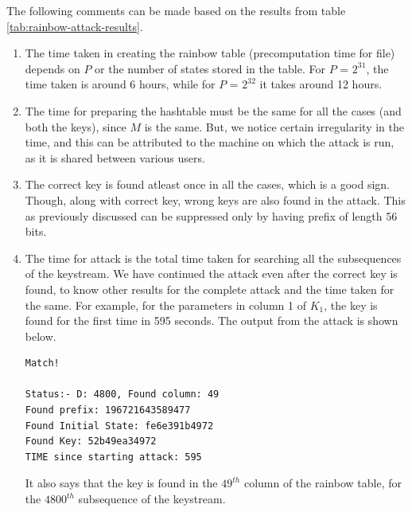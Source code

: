 The following comments can be made based on the results from table \ref{tab:rainbow-attack-results}.
\begin{enumerate}
\item The time taken in creating the rainbow table (precomputation time for file) depends on $P$ or the number of states stored in the table. For $P$ = $2^{31}$, the time taken is around 6 hours, while for $P$ = $2^{32}$ it takes around 12 hours. 

\item The time for preparing the hashtable must be the same for all the cases (and both the keys), since $M$ is the same. But, we notice certain irregularity in the time, and this can be attributed to the machine on which the attack is run, as it is shared between various users. 

\item The correct key is found atleast once in all the cases, which is a good sign. Though, along with correct key, wrong keys are also found in the attack. This as previously discussed can be suppressed only by having prefix of length 56 bits.

\item The time for attack is the total time taken for searching all the subsequences of the keystream. We have continued the attack even after the correct key is found, to know other results for the complete attack and the time taken for the same. For example, for the parameters in column 1 of $K_1$, the key is found for the first time in 595 seconds. The output from the attack is shown below.

\begin{lstlisting}[frame=tb]
Match!

Status:- D: 4800, Found column: 49
Found prefix: 196721643589477
Found Initial State: fe6e391b4972
Found Key: 52b49ea34972
TIME since starting attack: 595
\end{lstlisting}

It also says that the key is found in the $49^{th}$ column of the rainbow table, for the $4800^{th}$ subsequence of the keystream. 
\end{enumerate}


